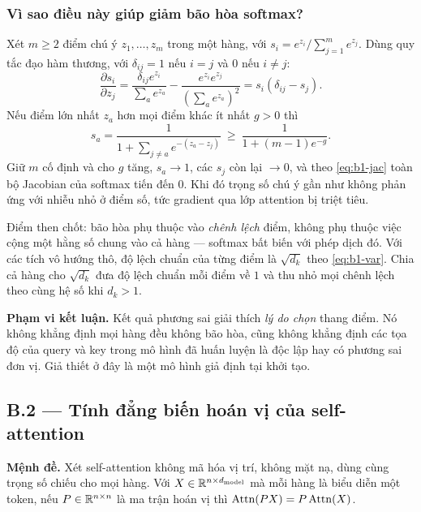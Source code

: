 \subsubsection{Vì sao điều này giúp giảm bão hòa softmax?}

Xét $m\ge2$ điểm chú ý $z_1,\ldots,z_m$ trong một hàng, với
$s_i=e^{z_i}/\sum_{j=1}^m e^{z_j}$. Dùng quy tắc đạo hàm thương, với
$\delta_{ij}=1$ nếu $i=j$ và $0$ nếu $i\ne j$:
\begin{equation}
  \frac{\partial s_i}{\partial z_j}
  =\frac{\delta_{ij}e^{z_i}}{\sum_a e^{z_a}}
   -\frac{e^{z_i}e^{z_j}}{(\sum_a e^{z_a})^2}
  =s_i(\delta_{ij}-s_j).
  \label{eq:b1-jac}
\end{equation}
Nếu điểm lớn nhất $z_a$ hơn mọi điểm khác ít nhất $g>0$ thì
\begin{equation}
  s_a=\frac{1}{1+\sum_{j\ne a} e^{-(z_a-z_j)}}
    \ \ge\ \frac{1}{1+(m-1)e^{-g}}.
  \label{eq:b1-sat}
\end{equation}
Giữ $m$ cố định và cho $g$ tăng, $s_a\to1$, các $s_j$ còn lại $\to0$, và theo
\eqref{eq:b1-jac} toàn bộ Jacobian của softmax tiến đến $0$. Khi đó trọng số chú ý
gần như không phản ứng với nhiễu nhỏ ở điểm số, tức gradient qua lớp attention bị
triệt tiêu.

Điểm then chốt: bão hòa phụ thuộc vào \emph{chênh lệch} điểm, không phụ thuộc việc
cộng một hằng số chung vào cả hàng --- softmax bất biến với phép dịch đó. Với các
tích vô hướng thô, độ lệch chuẩn của từng điểm là $\sqrt{d_k}$ theo
\eqref{eq:b1-var}. Chia cả hàng cho $\sqrt{d_k}$ đưa độ lệch chuẩn mỗi điểm về $1$
và thu nhỏ mọi chênh lệch theo cùng hệ số khi $d_k>1$.

\textbf{Phạm vi kết luận.} Kết quả phương sai giải thích \emph{lý do chọn} thang
điểm. Nó không khẳng định mọi hàng đều không bão hòa, cũng không khẳng định các tọa
độ của query và key trong mô hình đã huấn luyện là độc lập hay có phương sai đơn
vị. Giả thiết ở đây là một mô hình giả định tại khởi tạo.

\subsection{B.2 --- Tính đẳng biến hoán vị của self-attention}
\label{sec:b2}

\textbf{Mệnh đề.} Xét self-attention không mã hóa vị trí, không mặt nạ, dùng cùng
trọng số chiếu cho mọi hàng. Với $X\in\mathbb{R}^{n\times d_{\mathrm{model}}}$ mà mỗi hàng là biểu
diễn một token, nếu $P\in\mathbb{R}^{n\times n}$ là ma trận hoán vị thì
$\operatorname{Attn}(PX)=P\operatorname{Attn}(X)$.

